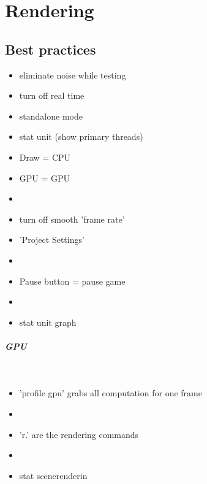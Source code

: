 \chapter{Rendering}
    \section{Best practices}
        \begin{itemize}
            \item eliminate noise while testing
            \item turn off real time
            \item standalone mode
            \item stat unit (show primary threads)
            \item Draw = CPU
            \item GPU = GPU
            \item 
            \item turn off smooth 'frame rate'
            \item 'Project Settings'
            \item 
            \item Pause button = pause game
            \item 
            \item stat unit graph
        \end{itemize}


        \paragraph{GPU} \mbox{} \\
        \begin{itemize}
            \item 'profile gpu' grabs all computation for one frame
            \item 
            \item 'r.' are the rendering commands
            \item 
            \item stat scenerenderin
        \end{itemize}

